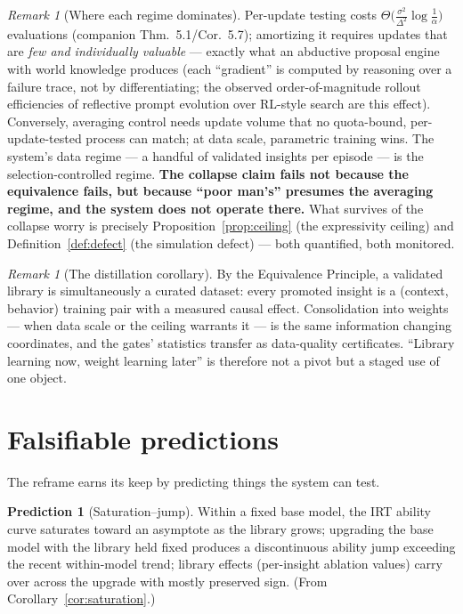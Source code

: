 \documentclass[11pt]{article}
\theoremstyle{plain}
\theoremstyle{definition}
\newtheorem{prediction}[theorem]{Prediction}
\theoremstyle{remark}
\newtheorem{remark}[theorem]{Remark}
\begin{document}
\begin{remark}[Where each regime dominates]
Per-update testing costs
$\Theta\bigl(\tfrac{\sigma^2}{\Delta^2}\log\tfrac1\alpha\bigr)$ evaluations
(companion Thm.~5.1/Cor.~5.7); amortizing it requires updates that are
\emph{few and individually valuable} --- exactly what an abductive proposal
engine with world knowledge produces (each ``gradient'' is computed by
reasoning over a failure trace, not by differentiating; the observed
order-of-magnitude rollout efficiencies of reflective prompt evolution over
RL-style search are this effect). Conversely, averaging control needs
update volume that no quota-bound, per-update-tested process can match;
at data scale, parametric training wins. The system's data regime ---
a handful of validated insights per episode --- is the selection-controlled
regime. \textbf{The collapse claim fails not because the equivalence fails,
but because ``poor man's'' presumes the averaging regime, and the system
does not operate there.} What survives of the collapse worry is precisely
Proposition~\ref{prop:ceiling} (the expressivity ceiling) and
Definition~\ref{def:defect} (the simulation defect) --- both quantified,
both monitored.
\end{remark}

\begin{remark}[The distillation corollary]
By the Equivalence Principle, a validated library is simultaneously a
curated dataset: every promoted insight is a (context, behavior) training
pair with a measured causal effect. Consolidation into weights --- when data
scale or the ceiling warrants it --- is the same information changing
coordinates, and the gates' statistics transfer as data-quality
certificates. ``Library learning now, weight learning later'' is therefore
not a pivot but a staged use of one object.
\end{remark}

\section{Falsifiable predictions}\label{sec:predictions}

The reframe earns its keep by predicting things the system can test.

\begin{prediction}[Saturation--jump]\label{pred:jump}
Within a fixed base model, the IRT ability curve saturates toward an
asymptote as the library grows; upgrading the base model with the library
held fixed produces a discontinuous ability jump exceeding the recent
within-model trend; library effects (per-insight ablation values) carry over
across the upgrade with mostly preserved sign. (From
Corollary~\ref{cor:saturation}.)
\end{prediction}
\end{document}
